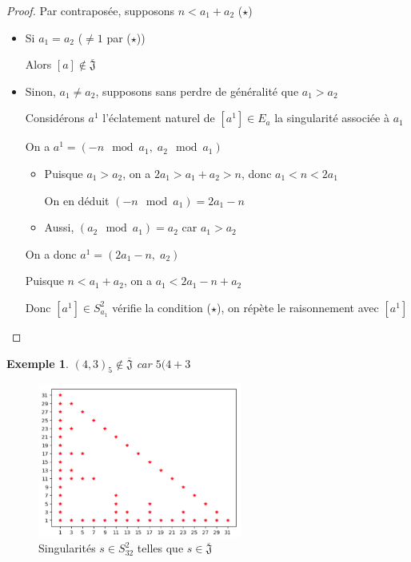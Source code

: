 \documentclass{article}
\newtheorem{example}{Exemple}
\newcommand{\J}{\mathfrak{J}}
\newcommand{\JS}{\overline{\J}}
\begin{document}
\begin{proof}
    Par contraposée, supposons $n < a_1 + a_2$ ($\star$)

    \begin{itemize}
        \item Si $a_1 = a_2$ ($\neq 1$ par ($\star$))

            Alors $[a] \not \in \JS$
        \item Sinon, $a_1 \neq a_2$, supposons sans perdre de généralité que $a_1 > a_2$

            Considérons $a^1$ l'éclatement naturel de $[a^1] \in E_a$ la singularité associée à $a_1$

            On a $a^1 = (-n \mod a_1,\; a_2 \mod a_1)$

            \begin{itemize}
                \item Puisque $a_1 > a_2$, on a $2a_1 > a_1 + a_2 > n$, donc $a_1 < n < 2a_1$
                    
                On en déduit $(-n \mod a_1) = 2a_1 - n$

                \item Aussi, $(a_2 \mod a_1) = a_2$ car $a_1 > a_2$
            \end{itemize}

            On a donc $a^1 = (2a_1-n,\; a_2)$

            Puisque $n < a_1 + a_2$, on a $a_1 < 2a_1 - n + a_2$

            Donc $[a^1] \in S_{a_1}^2$ vérifie la condition ($\star$), on répète le raisonnement avec $[a^1]$
    \end{itemize}
\end{proof}

\begin{example}
    ${(4, 3)}_5 \not \in \JS$ car $5 ( 4 + 3$
\end{example}

\begin{figure}[h]
    \caption{Singularités $s \in S_{32}^2$ telles que $s \in \JS$}
    \centering
    \includegraphics[width=0.6\textwidth]{singularite_j_strict_m2_n32}
\end{figure}
\end{document}
